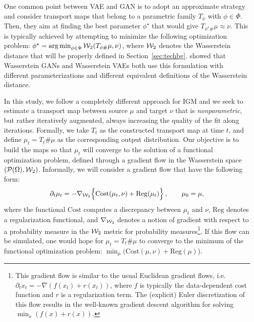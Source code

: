One common point between VAE and GAN is to adopt an approximate strategy and consider transport maps that belong to a parametric family $T_{\phi}$ with $\phi \in \Phi$. Then, they aim at finding the best parameter $\phi^\star$ that would give $T_{\phi^\star \#}\mu \approx \nu$. This is typically achieved by attempting to minimize the following optimization problem:
$\phi^\star = \operatorname*{arg\min}_{\phi \in \Phi} {\cal W}_2(T_{\phi \#}\mu, \nu)$,
where ${\cal W}_2$ denotes the Wasserstein distance that will be properly defined in Section~\ref{sec:techbg}.  \cite{genevay2017gan} showed that Wasserstein GANs \cite{arjovsky2017wasserstein} and Wasserstein VAEs \cite{tolstikhin2017wasserstein} both use this formulation with different parameterizations and different equivalent definitions of the Wasserstein distance. 

In this study, we follow a completely different approach for IGM and we seek to estimate a transport map between source $\mu$ and target $\nu$ that is \textit{nonparametric}, but rather iteratively augmented, always increasing the quality of the fit along iterations. Formally, we take $T_t$ as the constructed transport map at time $t$, and define $\mu_t=T_t \# \mu$ as the corresponding output distribution. Our objective is to build the maps so that $\mu_t$ will converge to the solution of a functional optimization problem, defined through a gradient flow in the Wasserstein space $({\cal P}(\Omega),{\cal W}_2)$. Informally, we will consider a gradient flow that have the following form:
\begin{align}
\partial_t \mu_t = - \nabla_{{\cal W}_2} \Bigl\{ \mathrm{Cost}(\mu_t, \nu) + \mathrm{Reg}(\mu_t)\Bigr\} \, , \qquad \mu_0 = \mu,\label{eqn:gradflow}
\end{align}
where the functional $\mathrm{Cost}$ computes a discrepancy between $\mu_t$ and $\nu$, $\mathrm{Reg}$ denotes a regularization functional, and $\nabla_{{\cal W}_2}$ denotes a notion of gradient with respect to a probability measure in the ${\cal W}_2$ metric for probability measures\footnote{This gradient flow is similar to the usual Euclidean gradient flows, i.e.\ $\partial_t x_t = - \nabla (f(x_t) + r(x_t))$, where $f$ is typically the data-dependent cost function and $r$ is a regularization term. The (explicit) Euler discretization of this flow results in the well-known gradient descent algorithm for solving $\min_x (f(x)+r(x))$.}. If this flow can be simulated, one would hope for $\mu_t=T_t\#\mu$ to converge to the minimum of the functional optimization problem: $\min_\mu ( \mathrm{Cost}(\mu, \nu) + \mathrm{Reg}(\mu)$).


